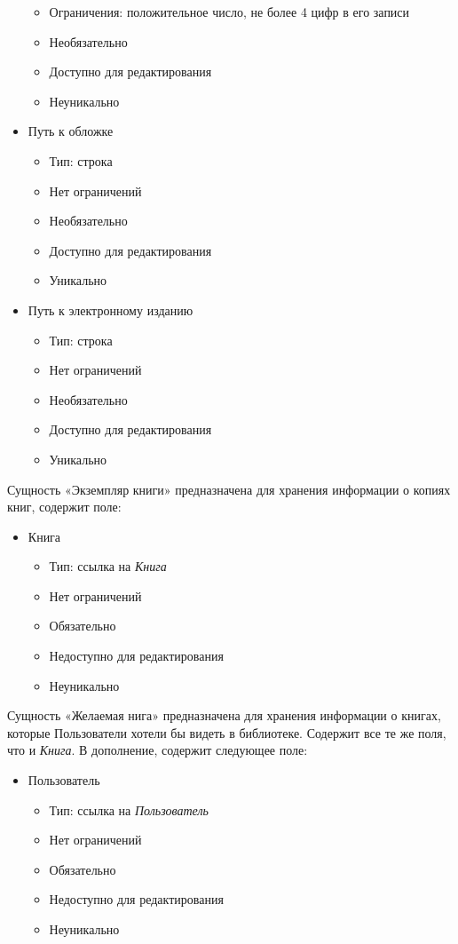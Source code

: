 \documentclass[data-specification.tex]{subfiles}
\begin{document}
\begin{itemize}
\begin{itemize}
        \item Ограничения: положительное число, не более 4 цифр в его записи
        \item Необязательно
        \item Доступно для редактирования
        \item Неуникально
    \end{itemize}
    \item Путь к обложке
    \begin{itemize}
        \item Тип: строка
        \item Нет ограничений
        \item Необязательно
        \item Доступно для редактирования
        \item Уникально
    \end{itemize}
    \item Путь к электронному изданию
    \begin{itemize}
        \item Тип: строка
        \item Нет ограничений
        \item Необязательно
        \item Доступно для редактирования
        \item Уникально
    \end{itemize}
\end{itemize}
\par
Сущность «Экземпляр книги» предназначена для хранения информации о копиях книг, содержит поле:
\begin{itemize}
    \item Книга
    \begin{itemize}
        \item Тип: ссылка на \textsl{Книга}
        \item Нет ограничений
        \item Обязательно
        \item Недоступно для редактирования
        \item Неуникально
    \end{itemize}
\end{itemize}
\par
Сущность «Желаемая нига» предназначена для хранения информации о книгах, которые Пользователи хотели бы видеть в библиотеке. Содержит все те же поля, что и \textsl{Книга}. В дополнение, содержит следующее поле:
\begin{itemize}
    \item Пользователь
    \begin{itemize}
        \item Тип: ссылка на \textsl{Пользователь}
        \item Нет ограничений
        \item Обязательно
        \item Недоступно для редактирования
        \item Неуникально
    \end{itemize}
\end{itemize}
\end{document}
